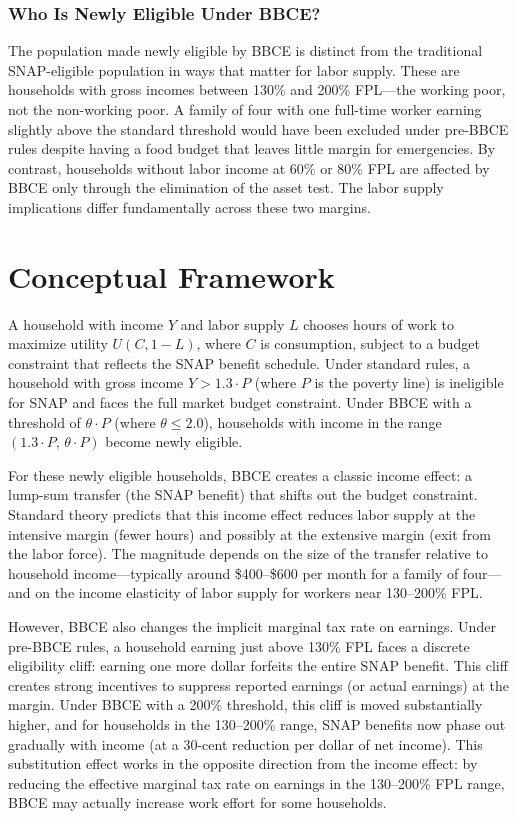 \documentclass[12pt]{article}
\begin{document}
\subsubsection*{Who Is Newly Eligible Under BBCE?} The population made newly eligible by BBCE is distinct from the traditional SNAP-eligible population in ways that matter for labor supply. These are households with gross incomes between 130\% and 200\% FPL---the working poor, not the non-working poor. A family of four with one full-time worker earning slightly above the standard threshold would have been excluded under pre-BBCE rules despite having a food budget that leaves little margin for emergencies. By contrast, households without labor income at 60\% or 80\% FPL are affected by BBCE only through the elimination of the asset test. The labor supply implications differ fundamentally across these two margins.

\section{Conceptual Framework}

A household with income $Y$ and labor supply $L$ chooses hours of work to maximize utility $U(C, 1-L)$, where $C$ is consumption, subject to a budget constraint that reflects the SNAP benefit schedule. Under standard rules, a household with gross income $Y > 1.3 \cdot P$ (where $P$ is the poverty line) is ineligible for SNAP and faces the full market budget constraint. Under BBCE with a threshold of $\theta \cdot P$ (where $\theta \leq 2.0$), households with income in the range $(1.3 \cdot P, \, \theta \cdot P)$ become newly eligible.

For these newly eligible households, BBCE creates a classic income effect: a lump-sum transfer (the SNAP benefit) that shifts out the budget constraint. Standard theory predicts that this income effect reduces labor supply at the intensive margin (fewer hours) and possibly at the extensive margin (exit from the labor force). The magnitude depends on the size of the transfer relative to household income---typically around \$400--\$600 per month for a family of four---and on the income elasticity of labor supply for workers near 130--200\% FPL.

However, BBCE also changes the implicit marginal tax rate on earnings. Under pre-BBCE rules, a household earning just above 130\% FPL faces a discrete eligibility cliff: earning one more dollar forfeits the entire SNAP benefit. This cliff creates strong incentives to suppress reported earnings (or actual earnings) at the margin. Under BBCE with a 200\% threshold, this cliff is moved substantially higher, and for households in the 130--200\% range, SNAP benefits now phase out gradually with income (at a 30-cent reduction per dollar of net income). This substitution effect works in the opposite direction from the income effect: by reducing the effective marginal tax rate on earnings in the 130--200\% FPL range, BBCE may actually increase work effort for some households.
\end{document}
